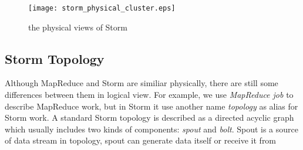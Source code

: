 \begin{figure}[h]
\graphicspath{{figure/}}
\texttt{[image: storm\_physical\_cluster.eps]}
\caption{the physical views of Storm}
\label{fig:zookeeper cluster}
\end{figure}

\subsection*{Storm Topology}

Although MapReduce and Storm are similiar physically, there are still some differences between them in logical view.
For example, we use {\em MapReduce job} to describe MapReduce work, but in Storm it use another name {\em topology} as alias for Storm work.
A standard Storm topology is described as a directed acyclic graph which usually includes two kinds of components: {\em spout} and {\em bolt}.
Spout is a source of data stream in topology, spout can generate data itself or receive it from  
